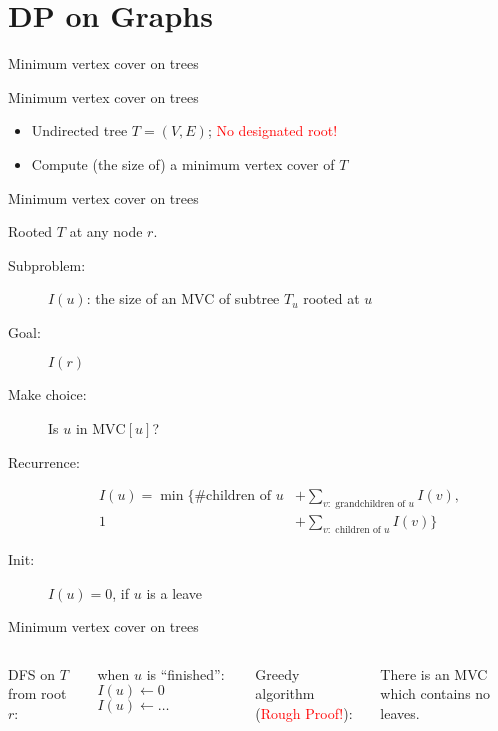 \section{DP on Graphs}

\begin{frame}{Minimum vertex cover on trees}
  \begin{exampleblock}{Minimum vertex cover on trees }
    \begin{itemize}
	  \item Undirected tree $T = (V, E)$; \textcolor{red}{No designated root!}
      \item Compute (the size of) a minimum vertex cover of $T$
    \end{itemize}
  \end{exampleblock}

\end{frame}
\begin{frame}{Minimum vertex cover on trees}
  \centerline{Rooted $T$ at any node $r$.}
  \pause
  \vspace{0.30cm}

  \begin{description}
	\item[Subproblem:] $I(u)$: the size of an MVC of subtree $T_{u}$ rooted at $u$
	\item[Goal:] $I(r)$
	  \pause
	\item[Make choice:] Is $u$ in $\text{MVC}[u]$?
	\item[Recurrence:] 
	  \begin{align*}
		I(u) = \min \{\text{\# children of } u &+ \sum_{v: \text{ grandchildren of } u} I(v), \\
			1 &+ \sum_{v: \text{ children of } u} I(v)\}
	  \end{align*}
	  \pause
	\item[Init:] $I(u) = 0$, if $u$ is a leave
  \end{description}
\end{frame}
\begin{frame}{Minimum vertex cover on trees}
  \begin{columns}
	  DFS on $T$ from root $r$:

	  \vspace{0.50cm}
	  \begin{algorithmic}
		\State when $u$ is ``finished'':
		  \State $I(u) \gets 0$
		\Else
		  \State $I(u) \gets \dots$ 
		\EndIf
	  \end{algorithmic}
	  \pause
	Greedy algorithm (\textcolor{red}{Rough Proof!}):

	  \vspace{0.50cm}
	  \begin{theorem}
		There is an MVC which contains no leaves.
	  \end{theorem}
  \end{columns}
\end{frame}

